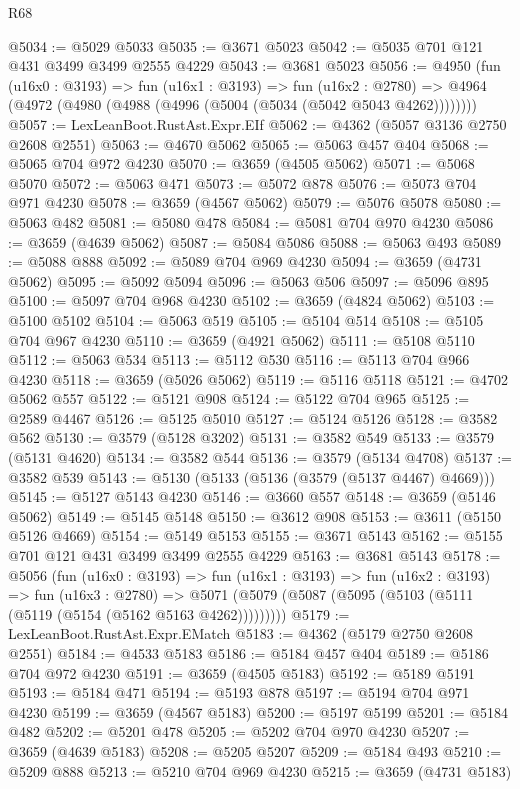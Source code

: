 \begin{lexlean}{R68}
\begin{coremodule}
@5034 := @5029 @5033
@5035 := @3671 @5023
@5042 := @5035 @701 @121 @431 @3499 @3499 @2555 @4229
@5043 := @3681 @5023
@5056 := @4950
    (fun (u16x0 : @3193) =>
    fun (u16x1 : @3193) =>
    fun (u16x2 : @2780) =>
    @4964 (@4972 (@4980 (@4988 (@4996 (@5004 (@5034 (@5042 @5043 @4262))))))))
@5057 := LexLeanBoot.RustAst.Expr.EIf
@5062 := @4362 (@5057 @3136 @2750 @2608 @2551)
@5063 := @4670 @5062
@5065 := @5063 @457 @404
@5068 := @5065 @704 @972 @4230
@5070 := @3659 (@4505 @5062)
@5071 := @5068 @5070
@5072 := @5063 @471
@5073 := @5072 @878
@5076 := @5073 @704 @971 @4230
@5078 := @3659 (@4567 @5062)
@5079 := @5076 @5078
@5080 := @5063 @482
@5081 := @5080 @478
@5084 := @5081 @704 @970 @4230
@5086 := @3659 (@4639 @5062)
@5087 := @5084 @5086
@5088 := @5063 @493
@5089 := @5088 @888
@5092 := @5089 @704 @969 @4230
@5094 := @3659 (@4731 @5062)
@5095 := @5092 @5094
@5096 := @5063 @506
@5097 := @5096 @895
@5100 := @5097 @704 @968 @4230
@5102 := @3659 (@4824 @5062)
@5103 := @5100 @5102
@5104 := @5063 @519
@5105 := @5104 @514
@5108 := @5105 @704 @967 @4230
@5110 := @3659 (@4921 @5062)
@5111 := @5108 @5110
@5112 := @5063 @534
@5113 := @5112 @530
@5116 := @5113 @704 @966 @4230
@5118 := @3659 (@5026 @5062)
@5119 := @5116 @5118
@5121 := @4702 @5062 @557
@5122 := @5121 @908
@5124 := @5122 @704 @965
@5125 := @2589 @4467
@5126 := @5125 @5010
@5127 := @5124 @5126
@5128 := @3582 @562
@5130 := @3579 (@5128 @3202)
@5131 := @3582 @549
@5133 := @3579 (@5131 @4620)
@5134 := @3582 @544
@5136 := @3579 (@5134 @4708)
@5137 := @3582 @539
@5143 := @5130 (@5133 (@5136 (@3579 (@5137 @4467) @4669)))
@5145 := @5127 @5143 @4230
@5146 := @3660 @557
@5148 := @3659 (@5146 @5062)
@5149 := @5145 @5148
@5150 := @3612 @908
@5153 := @3611 (@5150 @5126 @4669)
@5154 := @5149 @5153
@5155 := @3671 @5143
@5162 := @5155 @701 @121 @431 @3499 @3499 @2555 @4229
@5163 := @3681 @5143
@5178 := @5056
    (fun (u16x0 : @3193) =>
    fun (u16x1 : @3193) =>
    fun (u16x2 : @3193) =>
    fun (u16x3 : @2780) =>
    @5071 (@5079 (@5087 (@5095 (@5103 (@5111 (@5119 (@5154 (@5162 @5163 @4262)))))))))
@5179 := LexLeanBoot.RustAst.Expr.EMatch
@5183 := @4362 (@5179 @2750 @2608 @2551)
@5184 := @4533 @5183
@5186 := @5184 @457 @404
@5189 := @5186 @704 @972 @4230
@5191 := @3659 (@4505 @5183)
@5192 := @5189 @5191
@5193 := @5184 @471
@5194 := @5193 @878
@5197 := @5194 @704 @971 @4230
@5199 := @3659 (@4567 @5183)
@5200 := @5197 @5199
@5201 := @5184 @482
@5202 := @5201 @478
@5205 := @5202 @704 @970 @4230
@5207 := @3659 (@4639 @5183)
@5208 := @5205 @5207
@5209 := @5184 @493
@5210 := @5209 @888
@5213 := @5210 @704 @969 @4230
@5215 := @3659 (@4731 @5183)

\end{coremodule}
\end{lexlean}

